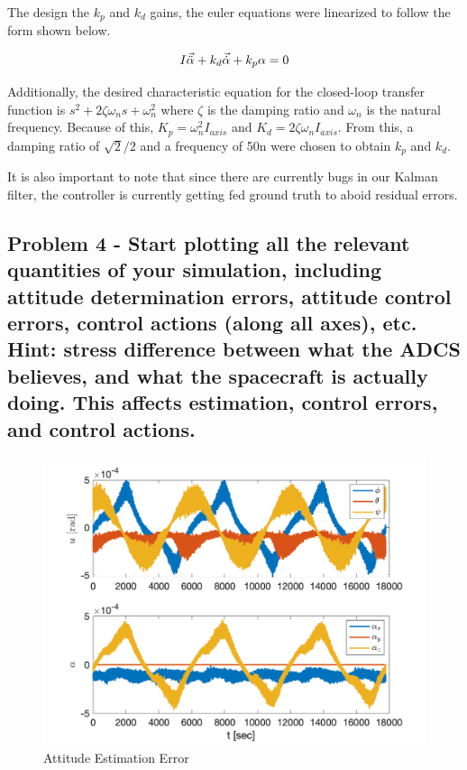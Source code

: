 The design the $k_p$ and $k_d$ gains, the euler equations were linearized to follow the form shown below.

\begin{equation}
    I \Vec{\Ddot{\alpha}} + k_d  \Vec{\dot \alpha} + k_p \alpha = 0
\end{equation}

Additionally, the desired characteristic equation for the closed-loop transfer function is $s^2 + 2\zeta\omega_n s +\omega_n^2$ where $\zeta$ is the damping ratio and $\omega_n$ is the natural frequency. Because of this, $K_p = \omega_n^2 I_{axis}$ and $K_d = 2\zeta\omega_n I_{axis}$. From this, a damping ratio of $\sqrt{2}/2$ and a frequency of 50n were chosen to obtain $k_p$ and $k_d$.

It is also important to note that since there are currently bugs in our Kalman filter, the controller is currently getting fed ground truth to aboid residual errors.


\subsection{Problem 4 - Start plotting all the relevant quantities of your simulation, including attitude determination errors, attitude control errors, control actions (along all axes), etc. Hint: stress difference between what the ADCS believes, and what the spacecraft is actually doing. This affects estimation, control errors, and control actions.}

\begin{figure}[H]
    \centering
    \captionsetup{ justification = centering }
    \includegraphics[width = 15cm]{Images/PS9/attitude_estimate_error.png}
    \caption{Attitude Estimation Error}
    \label{fig:attitudeEstimationError}
\end{figure}

